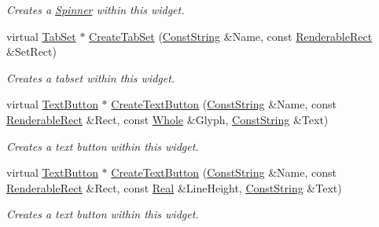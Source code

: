 \begin{DoxyCompactItemize}
\begin{DoxyCompactList}\small\item\em Creates a \hyperlink{classMezzanine_1_1UI_1_1Spinner}{Spinner} within this widget. \item\end{DoxyCompactList}\item 
virtual \hyperlink{classMezzanine_1_1UI_1_1TabSet}{TabSet} $\ast$ \hyperlink{classMezzanine_1_1UI_1_1RenderableContainerWidget_aa0ec24b4df0d3fd138f7b259fba1e30e}{CreateTabSet} (\hyperlink{namespaceMezzanine_a63cd699ac54b73953f35ec9cfc05e506}{ConstString} \&Name, const \hyperlink{structMezzanine_1_1UI_1_1RenderableRect}{RenderableRect} \&SetRect)
\begin{DoxyCompactList}\small\item\em Creates a tabset within this widget. \item\end{DoxyCompactList}\item 
virtual \hyperlink{classMezzanine_1_1UI_1_1TextButton}{TextButton} $\ast$ \hyperlink{classMezzanine_1_1UI_1_1RenderableContainerWidget_a7083c20a1b8e17c86f57265138f06ed9}{CreateTextButton} (\hyperlink{namespaceMezzanine_a63cd699ac54b73953f35ec9cfc05e506}{ConstString} \&Name, const \hyperlink{structMezzanine_1_1UI_1_1RenderableRect}{RenderableRect} \&Rect, const \hyperlink{namespaceMezzanine_adcbb6ce6d1eb4379d109e51171e2e493}{Whole} \&Glyph, \hyperlink{namespaceMezzanine_a63cd699ac54b73953f35ec9cfc05e506}{ConstString} \&Text)
\begin{DoxyCompactList}\small\item\em Creates a text button within this widget. \item\end{DoxyCompactList}\item 
virtual \hyperlink{classMezzanine_1_1UI_1_1TextButton}{TextButton} $\ast$ \hyperlink{classMezzanine_1_1UI_1_1RenderableContainerWidget_a8c5625278f0228bde4179b66ec933a65}{CreateTextButton} (\hyperlink{namespaceMezzanine_a63cd699ac54b73953f35ec9cfc05e506}{ConstString} \&Name, const \hyperlink{structMezzanine_1_1UI_1_1RenderableRect}{RenderableRect} \&Rect, const \hyperlink{namespaceMezzanine_a726731b1a7df72bf3583e4a97282c6f6}{Real} \&LineHeight, \hyperlink{namespaceMezzanine_a63cd699ac54b73953f35ec9cfc05e506}{ConstString} \&Text)
\begin{DoxyCompactList}\small\item\em Creates a text button within this widget. \item\end{DoxyCompactList}\item 

\end{DoxyCompactItemize}
